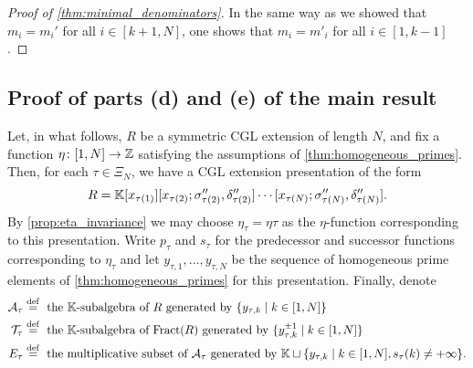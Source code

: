 \begin{proof}[Proof of \cref{thm:minimal_denominators}]
	In the same way as we showed that $m_i = m_i'$ for all $i \in [k+1, N]$, one shows that
	$m_i = m'_i$ for all $i \in [1, k-1]$.
\end{proof}

\subsection{Proof of parts (d) and (e) of the main result}

Let, in what follows, $R$ be a symmetric CGL extension of length $N$, and fix a
function $\eta \colon [1, N] \to \mathbb{Z}$ satisfying the assumptions of
\cref{thm:homogeneous_primes}. Then, for each $\tau \in \Xi_N$, we have a CGL extension
presentation of the form
\begin{equation*}
	R = \mathbb{K}[x_{\tau(1)}][x_{\tau(2)}; \sigma''_{\tau(2)}, \delta''_{\tau(2)}] \cdots [x_{\tau(N)}; \sigma''_{\tau(N)}, \delta''_{\tau(N)}].
\end{equation*}
%
By \cref{prop:eta_invariance} we may choose $\eta_\tau = \eta\tau$ as the
$\eta$-function corresponding to this presentation. Write $p_\tau$ and $s_\tau$ for the
predecessor and successor functions corresponding to $\eta_\tau$ and let $y_{\tau, 1},
	\dots, y_{\tau, N}$ be the sequence of homogeneous prime elements of
\cref{thm:homogeneous_primes} for this presentation. Finally, denote
\begin{align*}
	\mathcal{A}_\tau & \overset{\mathrm{def}}{=} \text{ the $\mathbb{K}$-subalgebra of $R$ generated by } \{y_{\tau, k} \mid k \in [1, N]\}                                                   \\
	\mathcal{T}_\tau & \overset{\mathrm{def}}{=} \text{ the $\mathbb{K}$-subalgebra of $\operatorname{Fract}(R)$ generated by } \{y_{\tau, k}^{\pm 1} \mid k \in [1, N]\}                                   \\
	E_\tau    & \overset{\mathrm{def}}{=} \text{ the multiplicative subset of $\mathcal{A}_\tau$ generated by } \mathbb{K} \sqcup \{y_{\tau, k} \mid k \in [1, N], s_\tau(k) \neq + \infty\}.
\end{align*}
